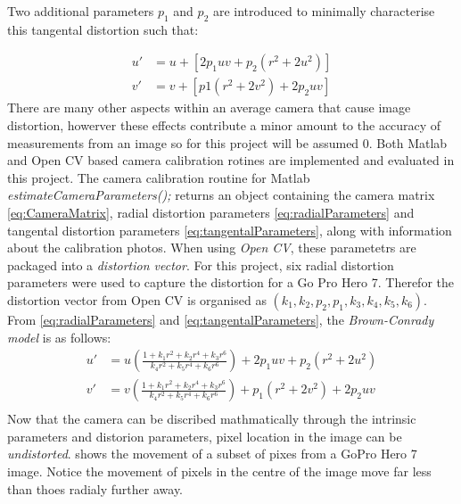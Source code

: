 \documentclass{UoNMCHA}
\numberwithin{equation}{section}
\begin{document}
Two additional parameters $p_{1}$ and $p_{2}$ are introduced to minimally characterise this tangental distortion such that:

\begin{equation}\label{eq:tangentalParameters}
	\begin{split}
		u' &= u + [2p_{1}uv + p_{2}(r^{2} + 2u^{2})]\\
		v' &= v  + [p1(r^{2} + 2v^2) + 2p_{2}uv]
	\end{split}
\end{equation}
There are many other aspects within an average camera that cause image distortion, howerver these effects contribute a minor amount to the accuracy of measurements from an image so for this project will be assumed $0$. Both Matlab and Open CV based camera calibration rotines are implemented and evaluated in this project. The camera calibration routine for Matlab \textit{estimateCameraParameters();} returns an object containing the camera matrix \ref{eq:CameraMatrix}, radial distortion parameters \ref{eq:radialParameters} and tangental distortion parameters \ref{eq:tangentalParameters}, along with information about the calibration photos. When using \textit{Open CV}, these parametetrs are packaged into a \textit{distortion vector}. For this project, six radial distortion parameters were used to capture the distortion for a Go Pro Hero 7. Therefor the distortion vector from Open CV is organised as $(k_{1}, k_{2}, p_{2}, p_{1}, k_{3}, k_{4}, k_{5}, k_{6})$.
From \cref{eq:radialParameters} and \cref{eq:tangentalParameters}, the \textit{Brown-Conrady model} is as follows:
\begin{equation}
	\begin{split}
		u' &= u\left(\frac{1  +k_{1}r^{2} + k_{2}r^{4} + k_{3}r^{6}}{k_{4}r^{2} + k_{5}r^{4} + k_{6}r^{6}}\right) + 2p_{1}uv + p_{2}(r^{2} + 2u^{2})\\
		v' &= v\left(\frac{1  +k_{1}r^{2} + k_{2}r^{4} + k_{3}r^{6}}{k_{4}r^{2} + k_{5}r^{4} + k_{6}r^{6}}\right)  + p_{1}(r^{2} + 2v^{2}) + 2p_{2}uv\\
	\end{split}
\end{equation}
Now that the camera can be discribed mathmatically through the intrinsic parameters and distorion parameters, pixel location in the image can be \textit{undistorted}.  shows the movement of a subset of pixes from a GoPro Hero 7 image. Notice the movement of pixels in the centre of the image move far less than thoes radialy further away.
\end{document}
